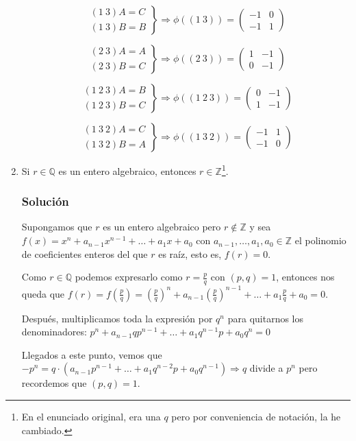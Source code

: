 \documentclass[paper=a4, fontsize=11pt, spanish]{scrartcl}
\begin{document}
\begin{enumerate}
		$$\left.\begin{aligned}
			(1\ 3)A = C\\
			(1\ 3)B = B
		\end{aligned}\right\} \Rightarrow \phi((1\ 3)) = \begin{pmatrix} -1 & 0\\ -1 & 1 \end{pmatrix}$$
		
		$$\left.\begin{aligned}
			(2\ 3)A = A\\
			(2\ 3)B = C
		\end{aligned}\right\} \Rightarrow \phi((2\ 3)) = \begin{pmatrix} 1 & -1\\ 0 & -1 \end{pmatrix}$$
		
		$$\left.\begin{aligned}
			(1\ 2\ 3)A = B\\
			(1\ 2\ 3)B = C
		\end{aligned}\right\} \Rightarrow \phi((1\ 2\ 3)) = \begin{pmatrix} 0 & -1\\ 1 & -1 \end{pmatrix}$$
		
		$$\left.\begin{aligned}
			(1\ 3\ 2)A = C\\
			(1\ 3\ 2)B = A
		\end{aligned}\right\} \Rightarrow \phi((1\ 3\ 2)) = \begin{pmatrix} -1 & 1\\ -1 & 0 \end{pmatrix}$$
		
       
		\item Si $r \in \mathbb{Q}$ es un entero algebraico, entonces $r \in \mathbb{Z}$\footnote{En el enunciado
		original, era una $q$ pero por conveniencia de notación, la he cambiado.}.
		\subsubsection*{Solución}
		Supongamos que $r$ es un entero algebraico pero $r \notin \mathbb{Z}$ y sea $f(x) = x^n + a_{n-1}x^{n-1}
		+ \dots + a_1x + a_0$ con $a_{n-1}, \dots, a_1, a_0 \in \mathbb{Z}$ el polinomio de coeficientes enteros
		del que $r$ es raíz, esto es, $f(r) = 0$.
		
		Como $r \in \mathbb{Q}$ podemos expresarlo como $\displaystyle r = \frac{p}{q}$ con $(p, q) = 1$, entonces
		nos queda que $\displaystyle f(r) = f\left(\frac{p}{q}\right) = \left(\frac{p}{q}\right)^n + a_{n-1}
		\left(\frac{p}{q}\right)^{n-1} + \dots + a_1\frac{p}{q} + a_0 = 0$.
		
		Después, multiplicamos toda la expresión por $q^n$ para quitarnos los denominadores: $p^n + a_{n-1}qp^{n-1}
		+ \dots + a_1q^{n-1}p + a_0q^n = 0$
		
		Llegados a este punto, vemos que $-p^n = q \cdot \left(a_{n-1}p^{n-1} + \dots + a_1q^{n-2}p + a_0q^{n-1}\right)
		\Rightarrow q$ divide a $p^n$ pero recordemos que $(p, q) = 1$.
	\end{enumerate}
\end{document}
